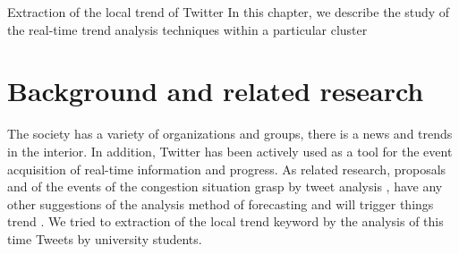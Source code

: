 \chapterhead
{Extraction of the local trend of Twitter}
{In this chapter, we describe the study of the real-time trend analysis techniques within a particular cluster}


\section{Background and related research}
The society has a variety of organizations and groups, there is a news and trends in the interior. In addition, Twitter has been actively used as a tool for the event acquisition of real-time information and progress.
As related research, proposals and of the events of the congestion situation grasp by tweet analysis \cite{socialevent}, have any other suggestions of the analysis method of forecasting and will trigger things trend \cite{trendtrigger}.
We tried to extraction of the local trend keyword by the analysis of this time Tweets by university students.

